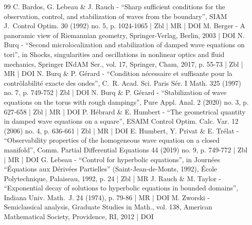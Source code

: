 \begin{thebibliography}{99}
C. Bardos, G. Lebeau \& J. Rauch - “Sharp sufficient conditions for the observation, control, and stabilization of waves from the boundary”, SIAM J. Control Optim. 30 (1992) no. 5, p. 1024-1065 | Zbl | MR | DOI
M. Berger - A panoramic view of Riemannian geometry, Springer-Verlag, Berlin, 2003 | DOI
N. Burq - “Second microlocalization and stabilization of damped wave equations on tori”, in Shocks, singularities and oscillations in nonlinear optics and fluid mechanics, Springer INdAM Ser., vol. 17, Springer, Cham, 2017, p. 55-73 | Zbl | MR | DOI
N. Burq \& P. Gérard - “Condition nécessaire et suffisante pour la contrôlabilité exacte des ondes”, C. R. Acad. Sci. Paris Sér. I Math. 325 (1997) no. 7, p. 749-752 | Zbl | DOI
N. Burq \& P. Gérard - “Stabilization of wave equations on the torus with rough dampings”, Pure Appl. Anal. 2 (2020) no. 3, p. 627-658 | Zbl | MR | DOI
P. Hébrard \& E. Humbert - “The geometrical quantity in damped wave equations on a square”, ESAIM Control Optim. Calc. Var. 12 (2006) no. 4, p. 636-661 | Zbl | MR | DOI
E. Humbert, Y. Privat \& E. Trélat - “Observability properties of the homogeneous wave equation on a closed manifold”, Comm. Partial Differential Equations 44 (2019) no. 9, p. 749-772 | Zbl | MR | DOI
G. Lebeau - “Control for hyperbolic equations”, in Journées “Équations aux Dérivées Partielles” (Saint-Jean-de-Monts, 1992), École Polytechnique, Palaiseau, 1992, p. 24 | Zbl | MR
J. Rauch \& M. Taylor - “Exponential decay of solutions to hyperbolic equations in bounded domains”, Indiana Univ. Math. J. 24 (1974), p. 79-86 | MR | DOI
M. Zworski - Semiclassical analysis, Graduate Studies in Math., vol. 138, American Mathematical Society, Providence, RI, 2012 | DOI
\end{thebibliography}
